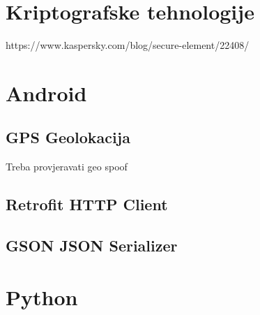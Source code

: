 \section{Kriptografske tehnologije}
https://www.kaspersky.com/blog/secure-element/22408/
\section{Android}
\subsection{GPS Geolokacija}
Treba provjeravati geo spoof
\subsection{Retrofit HTTP Client}
\subsection{GSON JSON Serializer}
\section{Python}
